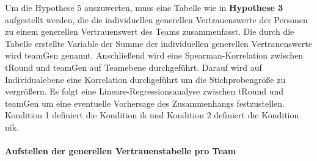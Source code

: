 \documentclass[a4paper,11pt]{article}%
\renewcommand{\\}{\vspace*{0.5\baselineskip} \newline}
\begin{document}
Um die Hypothese 5 auszuwerten, muss eine Tabelle wie in \textbf{Hypothese 3} aufgestellt werden, die die individuellen generellen Vertrauenswerte der Personen zu einem generellen Vertrauenswert des Teams zusammenfasst. Die durch die Tabelle erstellte Variable der Summe der individuellen generellen Vertrauenswerte wird \ac{teamGen} genannt.
Anschließend wird eine Spearman-Korrelation zwischen \ac{tRound} und \ac{teamGen} auf Teamebene durchgeführt. Darauf wird auf Individualebene eine Korrelation durchgeführt um die Stichprobengröße zu vergrößern. Es folgt eine Lineare-Regressionsanalyse zwischen \ac{tRound} und \ac{teamGen} um eine eventuelle Vorhersage des Zusammenhangs festzustellen. Kondition 1 definiert die Kondition \ac{ik} und Kondition 2 definiert die Kondition \ac{nik}.

		\paragraph{Aufstellen der generellen Vertrauenstabelle pro Team}
\end{document}

